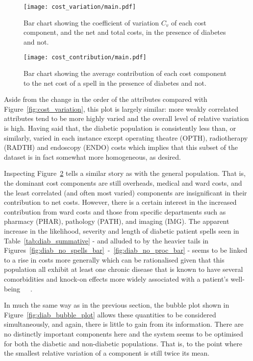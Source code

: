 \begin{figure}[h]
    \centering
    \texttt{[image: cost\_variation/main.pdf]}
    \caption{Bar chart showing the coefficient of variation \(C_{v}\) of each
        cost component, and the net and total costs, in the presence of diabetes
        and not.}%
    \label{fig:diab_variation}
\end{figure}

\begin{figure}[h]
    \centering
    \texttt{[image: cost\_contribution/main.pdf]}
    \caption{Bar chart showing the average contribution of each cost component
        to the net cost of a spell in the presence of diabetes and not.}%
    \label{fig:diab_contribution}
\end{figure}

Aside from the change in the order of the attributes compared with
Figure~\ref{fig:cost_variation}, this plot is largely similar: more weakly
correlated attributes tend to be more highly varied and the overall level of
relative variation is high. Having said that, the diabetic population is
consistently less than, or similarly, varied in each instance except operating
theatre (OPTH), radiotherapy (RADTH) and endoscopy (ENDO) costs which implies
that this subset of the dataset is in fact somewhat more homogeneous, as
desired.

Inspecting Figure~\ref{fig:diab_contribution} tells a similar story as with the
general population. That is, the dominant cost components are still overheads,
medical and ward costs, and the least correlated (and often most varied)
components are insignificant in their contribution to net costs. However, there
is a certain interest in the increased contribution from ward costs and those
from specific departments such as pharmacy (PHAR), pathology (PATH), and imaging
(IMG). The apparent increase in the likelihood, severity and length of diabetic
patient spells seen in Table~\ref{tab:diab_summative} \-- and alluded to by the
heavier tails in
Figures~\ref{fig:diab_no_spells_bar}~\--~\ref{fig:diab_no_proc_bar} \-- seems to
be linked to a rise in costs more generally which can be rationalised given
that this population all exhibit at least one chronic disease that is known to
have several comorbidities and knock-on effects more widely associated with a
patient's well-being~\cite{Deschenes2015}~\cite{Klimek2015}~\cite{Walker2016}.

In much the same way as in the previous section, the bubble plot shown in
Figure~\ref{fig:diab_bubble_plot} allows these quantities to be considered
simultaneously, and again, there is little to gain from its information. There
are no distinctly important components here and the system seems to be optimised
for both the diabetic and non-diabetic populations. That is, to the point where
the smallest relative variation of a component is still twice its mean.

